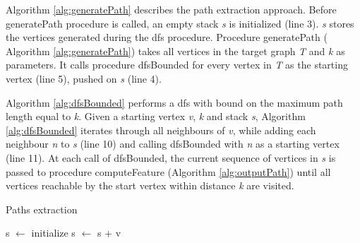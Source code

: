 \documentclass{l4proj}
\begin{document}
Algorithm \ref{alg:generatePath} describes the path extraction approach. Before generatePath procedure is called, an empty stack \emph{s} is initialized (line 3). \emph{s} stores the vertices generated during the \gls{dfs} procedure. Procedure generatePath ( \textrm{Algorithm \ref{alg:generatePath}}) takes all vertices in the target graph \emph{T} and \emph{k} as parameters. It calls procedure dfsBounded for every vertex in \emph{T} as the starting vertex (line 5), pushed on \emph{s} (line 4).

Algorithm \ref{alg:dfsBounded} performs a \gls{dfs} with bound on the maximum path length equal to \emph{k}. Given a starting vertex \emph{v}, \emph{k} and stack \emph{s}, Algorithm \ref{alg:dfsBounded} iterates through all neighbours of \emph{v}, while adding each neighbour \emph{n} to \emph{s} (line 10) and calling dfsBounded with \emph{n} as a starting vertex (line 11). At each call of dfsBounded, the current sequence of vertices in \emph{s} is passed to procedure computeFeature (Algorithm \ref{alg:outputPath}) until all vertices reachable by the start vertex within distance \emph{k} are visited.

\begin{algorithm}
\centering
\caption{Paths extraction}
\label{alg:generatePath}
\begin{algorithmic}[1]
	\State s $\gets$ initialize 
	\State s $\gets$ s + v 
	\State {}
\EndFor
\EndProcedure
\end{algorithmic}
\end{algorithm}
\end{document}
